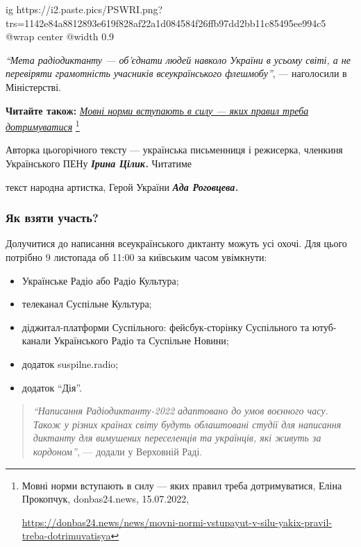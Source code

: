 \ifcmt
  ig https://i2.paste.pics/PSWRI.png?trs=1142e84a8812893e619f828af22a1d084584f26ffb97dd2bb11c85495ee994c5
  @wrap center
  @width 0.9
\fi

\begin{leftbar}
\emph{\enquote{Мета радіодиктанту — об'єднати людей навколо України в усьому світі, а не
перевіряти грамотність учасників всеукраїнського флешмобу}}, — наголосили в
Міністерстві. 
\end{leftbar}

\textbf{Читайте також:} \href{https://donbas24.news/news/movni-normi-vstupayut-v-silu-yakix-pravil-treba-dotrimuvatisya}{\emph{Мовні норми вступають в силу — яких правил треба дотримуватися}}%
\footnote{Мовні норми вступають в силу — яких правил треба дотримуватися, Еліна Прокопчук, donbas24.news, 15.07.2022, \par%
\url{https://donbas24.news/news/movni-normi-vstupayut-v-silu-yakix-pravil-treba-dotrimuvatisya}%
}


Авторка цьогорічного тексту — українська письменниця і режисерка, членкиня
Українського ПЕНу \emph{\textbf{Ірина Цілик.}} Читатиме\par\noindent текст народна артистка, Герой України
\emph{\textbf{Ада Роговцева.}}

\subsubsection{Як взяти участь?}

Долучитися до написання всеукраїнського диктанту можуть усі охочі. Для цього
потрібно 9 листопада об 11:00 за київським часом увімкнути:

\begin{itemize}
  \item Українське Радіо або Радіо Культура;
  \item телеканал Суспільне Культура;
  \item діджитал-платформи Суспільного: фейсбук-сторінку Суспільного та ютуб-канали Українського Радіо та Суспільне Новини;
  \item додаток suspilne.radio;
  \item додаток \enquote{Дія}.
\end{itemize}

\begin{quote}
\emph{\enquote{Написання Радіодиктанту-2022 адаптовано до умов воєнного часу. Також у різних
країнах світу будуть облаштовані студії для написання диктанту для вимушених
переселенців та українців, які живуть за кордоном}}, — додали у Верховній Раді.
\end{quote}

